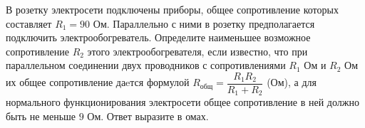 \begin{ex}
	\begin{condition}
		В розетку электросети подключены приборы, общее сопротивление которых составляет \( R_1=90 \) Ом. Параллельно с ними в розетку предполагается подключить электрообогреватель. Определите наименьшее возможное сопротивление \( R_2 \) этого электрообогревателя, если известно, что при параллельном соединении двух проводников с сопротивлениями \( R_1 \) Ом и \( R_2 \) Ом их общее сопротивление даeтся формулой \( R_{\text{общ}}=\dfrac{R_1R_2}{R_1+R_2} \) (Ом), а для нормального функционирования электросети общее сопротивление в ней должно быть не меньше \( 9 \) Ом. Ответ выразите в омах.
	\end{condition}
\end{ex}